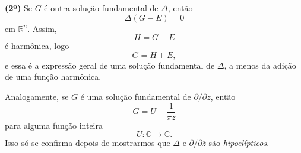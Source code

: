 \documentclass[../distribution_theory_notes.tex]{subfiles}
\begin{document}
\textbf{(2º)} Se \(G\) é outra solução fundamental de \(\Delta\), então
\[
	\Delta(G-E)=0
\]
em \(\mathbb{R}^{n}\). Assim,
\[
	H=G-E
\]
é harmônica, logo
\[
	G=H+E,
\]
e essa é a expressão geral de uma solução fundamental de \(\Delta\), a menos da adição de uma função harmônica.

Analogamente, se \(G\) é uma solução fundamental de \(\partial/\partial\overline{z}\), então
\[
	G=U+\frac{1}{\pi z}
\]
para alguma função inteira
\[
	U:\mathbb{C}\longrightarrow\mathbb{C}.
\]
Isso só se confirma depois de mostrarmos que \(\Delta\) e \(\partial/\partial\overline{z}\) são \textit{hipoelípticos}.
\end{document}
